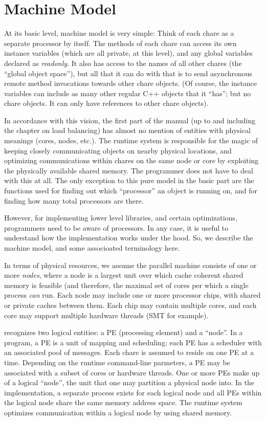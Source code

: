 \section{Machine Model}
\label{machineModel}
\label{sec:machine}
At its basic level, \charmpp{} machine model is very simple: Think of
each chare as a separate processor by itself. The methods of each
chare can access its own instance variables (which are all private, at
this level), and any global variables declared as {\em readonly}. It
also has access to the names of all other chares (the ``global object
space''), but all that it can do with that is to send asynchronous
remote method invocations towards other chare objects. (Of course, the
instance variables can include as many other regular C++ objects that
it ``has''; but no chare objects. It can only have references to other
chare objects).

In accordance with this vision, the first part of the manual (up to
and including the chapter on load balancing) has almost no mention of
entities with physical meanings (cores, nodes, etc.). The runtime
system is responsible for the magic of keeping closely communicating
objects on nearby physical locations, and optimizing communications
within chares on the same node or core by exploiting the physically
available shared memory. The programmer does not have to deal with
this at all. The only exception to this pure model in the basic part
are the functions used for finding out which ``processor'' an object
is running on, and for finding how many total processors are there.

However, for implementing lower level libraries, and certain optimizations,
programmers need to be aware of processors. In any case, it is useful
to understand how the \charmpp{} implementation works under the hood. So,
we describe the machine model, and some associoated terminology here.

In terms of physical resources, we assume the parallel machine
consists of one or more {\em nodes}, where a node is a largest unit
over which cache coherent shared memory is feasible (and therefore,
the maximal set of cores per which a single process {\em can} run.
Each node may include one or more processor chips, with shared or
private caches between them. Each chip may contain multiple cores, and
each core may support multiple hardware threads (SMT for example).

\charmpp{} recognizes two logical entities: a PE (processing element) and 
a ``node''.   In a \charmpp{} program, a PE is a
unit of mapping and scheduling: each PE has a scheduler with an
associated pool of messages. Each chare is assumed to reside on one PE
at a time. Depending on the runtime command-line parmeters, a PE may
be associated with a subset of cores or hardware threads. One or more PEs
make up of a logical ``node'', the unit that one may partition a physical node
into. In the implementation, a separate
process exists for each logical node and all PEs within the logical node share
the same memory address space. The \charmpp{} runtime system optimizes
communication within a logical node by using shared memory. 

